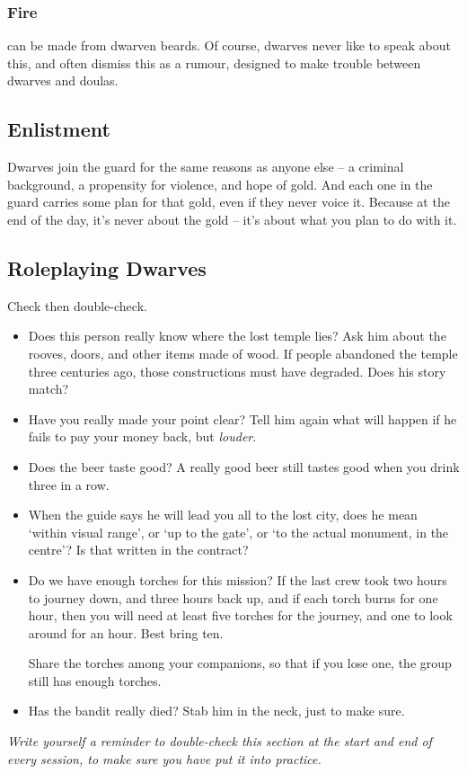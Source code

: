 \begin{multicols}{2}
\subsubsection{Fire }
can be made from dwarven beards.
Of course, dwarves never like to speak about this, and often dismiss this as a rumour, designed to make trouble between dwarves and \glspl{doula}.

\subsection{Enlistment}

Dwarves join the \gls{guard} for the same reasons as anyone else -- a criminal background, a propensity for violence, and hope of gold.
And each one in the \gls{guard} carries some plan for that gold, even if they never voice it.
Because at the end of the day, it's never about the gold -- it's about what you plan to do with it.

\subsection{Roleplaying Dwarves}

Check then double-check.

\begin{itemize}
  \item
  Does this person really know where the lost temple lies?
  Ask him about the rooves, doors, and other items made of wood.
  If people abandoned the temple three centuries ago, those constructions must have degraded.
  Does his story match?
  \item
  Have you really made your point clear?
  Tell him again what will happen if he fails to pay your money back, but \emph{louder}.
  \item
  Does the beer taste good?
  A really good beer still tastes good when you drink three in a row.
  \item
  When the guide says he will lead you all to the lost city, does he mean `within visual range', or `up to the gate', or `to the actual monument, in the centre'?
  Is that written in the contract?
  \item
  Do we have enough torches for this mission?
  If the last crew took two hours to journey down, and three hours back up, and if each torch burns for one hour, then you will need at least five torches for the journey, and one to look around for an hour.
  Best bring ten.

  Share the torches among your companions, so that if you lose one, the group still has enough torches.
  \item
  Has the bandit really died?
  Stab him in the neck, just to make sure.
\end{itemize}

\emph{Write yourself a reminder to double-check this section at the start and end of every session, to make sure you have put it into practice.}

\end{multicols}

